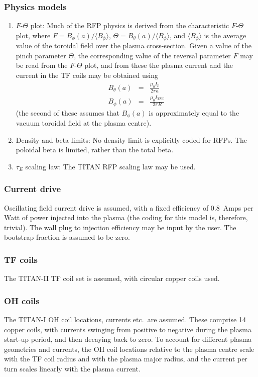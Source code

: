{\subsubsection{Physics models}
\begin{enumerate}
\item
$F$-$\Theta$ plot: Much of the RFP physics is derived from the characteristic
$F$-$\Theta$ plot, where $F = B_\phi (a)/\langle B_\phi \rangle$, $\Theta =
B_\theta (a)/\langle B_\phi \rangle$, and $\langle B_\phi \rangle$ is the
average value of the toroidal field over the plasma cross-section. Given a
value of the pinch parameter $\Theta$, the corresponding value of the reversal
parameter $F$ may be read from the $F$-$\Theta$ plot, and from these the plasma
current and the current in the TF coils may be obtained using
\begin{eqnarray*}
B_\theta (a) & = & \frac{\mu_0 I_p}{2\pi a} \\
B_\phi (a)   & = & \frac{\mu_0 I_{TFC}}{2\pi R}
\end{eqnarray*}
(the second of these assumes that $B_\phi (a)$ is approximately equal to the
vacuum toroidal field at the plasma centre).

\item
Density and beta limits: No density limit is explicitly coded for RFPs. The
poloidal beta is limited, rather than the total beta.

\item
$\tau_E$ scaling law: The TITAN RFP scaling law may be used.

\end{enumerate}

\subsubsection{Current drive}
Oscillating field current drive is assumed, with a fixed efficiency of
0.8~Amps per Watt of power injected into the plasma (the coding for this model
is, therefore, trivial). The wall plug to injection efficiency may be
input by the user. The bootstrap fraction is assumed to be zero.

\subsubsection{TF coils}
The TITAN-II TF coil set is assumed, with circular copper coils used.

\subsubsection{OH coils}
The TITAN-I OH coil locations, currents etc.\ are assumed. These comprise 14
copper coils, with currents swinging from positive to negative during the
plasma start-up period, and then decaying back to zero. To account for
different plasma geometries and currents, the OH coil locations relative to
the plasma centre scale with the TF coil radius and with the plasma major
radius, and the current per turn scales linearly with the plasma current.

}
